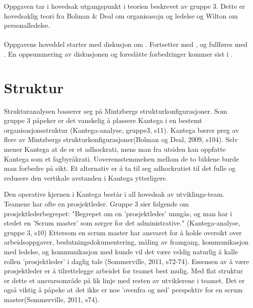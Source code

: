 \documentclass[12pt, a4paper]{article}
\begin{document}
Oppgaven tar i hovedsak utgangspunkt i teorien beskrevet av gruppe 3. Dette er
hovedsaklig teori fra Bolman \& Deal om organisasojn og ledelse og Wilton om
personalledelse.

\paragraph{} Oppgavens hoveddel starter med diskusjon om .
Fortsetter med , og fullføres med . 
En oppsummering av diskusjonen og foreslåtte forbedringer kommer sist i
.

\section{Struktur}\label{struktur}

Strukturanalysen basserer seg på Mintzbergs strukturkonfigurasjoner. 
Som gruppe 3 påpeker er det vanskelig å plassere Kantega i en bestemt
organisasjonsstruktur (Kantega-analyse, gruppe3, s11). Kantega bærer preg av
flere av Mintzbergs
strukturkonfigurasjoner(Bolman og Deal, 2009, s104). Selv mener Kantega at de
er et adhockrati, mens man fra utsiden kan oppfatte Kantega som et fagbyråkrati.
Uoverensstemmelsen mellom de to bildene burde man forbedre på sikt. Et
alternativ er å ta til seg adhockratiet til det fulle og redusere den vertikale
avstanden i Kantega ytterligere.

Den operative kjernen i Kantega består i all hovedsak av utviklings-team.
Teamene har ofte en prosjektleder. Gruppe 3 sier følgende om
prosjektlederbegrepet:  
"Begrepet om en 'prosjektleder' unngås, og man har i stedet en 'Scrum master' som
sørger for det administrative." (Kantega-analyse, gruppe 3, s10)
Ettersom en scrum master har ansvaret for å
holde oversikt over arbeidsoppgaver, beslutningsdokumentering, måling av
framgang, kommunikasjon med ledelse, og kommunikasjon med kunde vil det være
veldig naturlig å kalle rollen 'prosjektleder' i daglig tale (Sommerville,
2011, s72-74). Essensen av å være prosjektleder er å tilrettelegge arbeidet for
teamet best mulig. Med flat struktur er dette et ansvarsområde på lik linje med
resten av utviklerene i teamet. Det er også viktig å påpeke at det ikke er
noe 'ovenfra og ned' perspektiv for en scrum master(Sommerville, 2011, s74).

\end{document}
